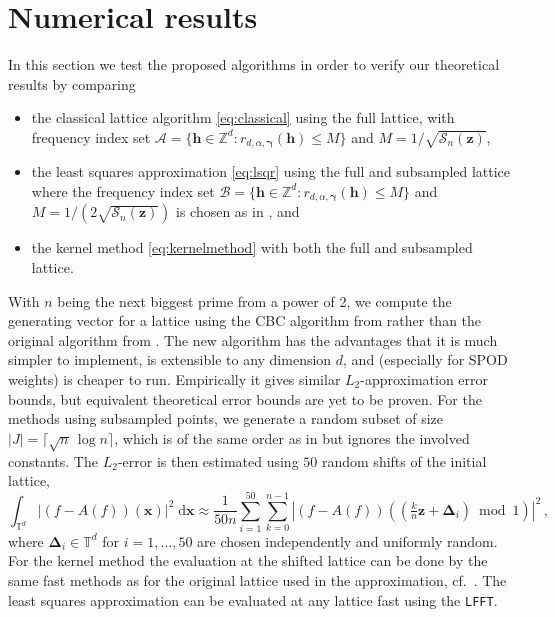 \documentclass[a4paper]{amsart}
\newcommand{\modone}{\bmod{}1}
\begin{document}
 \section{Numerical results}\label{sec:numerics} 

In this section we test the proposed algorithms in order to verify our theoretical results by comparing
\begin{itemize}
    \item the classical lattice algorithm \eqref{eq:classical} using the full lattice, with frequency index set $\mathcal A = \{\bm h\in\mathds Z^d : r_{d,\alpha,\bm\gamma}(\bm h)\le M\}$ and $M = 1/\sqrt{\mathcal S_n(\bm z)}$,
    \item the least squares approximation \eqref{eq:lsqr} using the full and subsampled lattice where the frequency index set $\mathcal B = \{\bm h\in\mathds Z^d : r_{d,\alpha,\bm\gamma}(\bm h)\le M\}$ and $M = 1/(2\sqrt{\mathcal S_n(\bm z)})$ is chosen as in , and
    \item the kernel method \eqref{eq:kernelmethod} with both the full and subsampled lattice.
\end{itemize}
With $n$ being the next biggest prime from a power of 2, we compute the generating vector for a lattice using the CBC algorithm from \cite{GS25} rather than the original algorithm from \cite{CKNS20}.
The new algorithm has the advantages that it is much simpler to implement, is extensible to any dimension $d$, and (especially for SPOD weights) is cheaper to run.
Empirically it gives similar $L_2$-approximation error bounds, but equivalent theoretical error bounds are yet to be proven.
For the methods using subsampled points, we generate a random subset of size $|J| = \lceil \sqrt{n}\,\log n\rceil$, which is of the same order as in  but ignores the involved constants.
The $L_2$-error is then estimated using $50$ random shifts of the initial lattice,
\begin{equation*}
    \int_{\mathds T^d} |(f-A(f))(\bm x)|^2 \;\mathrm d\bm x
    \approx \frac{1}{50n} \sum_{i=1}^{50} \sum_{k=0}^{n-1} |(f-A(f))((\tfrac kn\bm z+\bm\Delta_i)\modone)|^2 \,,
\end{equation*}
where $\bm\Delta_i\in\mathds T^d$ for $i=1,\dots,50$ are chosen independently and uniformly random.
For the kernel method the evaluation at the shifted lattice can be done by the same fast methods as for the original lattice used in the approximation, cf.\ \cite[Section~5]{KKKNS21}.
The least squares approximation can be evaluated at any lattice fast using the \texttt{LFFT}.
\end{document}
